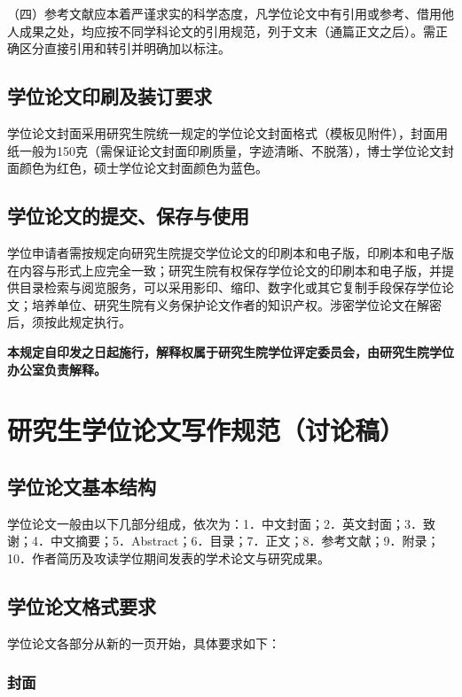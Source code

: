 \documentclass[a4paper,12pt,oneside,openany]{book}
\begin{document}
（四）参考文献应本着严谨求实的科学态度，凡学位论文中有引用或参考、借用他人成果之处，均应按不同学科论文的引用规范，列于文末（通篇正文之后）。需正确区分直接引用和转引并明确加以标注。


\section{学位论文印刷及装订要求}

学位论文封面采用研究生院统一规定的学位论文封面格式（模板见附件），封面用纸一般为150克（需保证论文封面印刷质量，字迹清晰、不脱落），博士学位论文封面颜色为红色，硕士学位论文封面颜色为蓝色。


\section{学位论文的提交、保存与使用}

学位申请者需按规定向研究生院提交学位论文的印刷本和电子版，印刷本和电子版在内容与形式上应完全一致；研究生院有权保存学位论文的印刷本和电子版，并提供目录检索与阅览服务，可以采用影印、缩印、数字化或其它复制手段保存学位论文；培养单位、研究生院有义务保护论文作者的知识产权。涉密学位论文在解密后，须按此规定执行。

\textbf{本规定自印发之日起施行，解释权属于研究生院学位评定委员会，由研究生院学位办公室负责解释。} 


\chapter{研究生学位论文写作规范（讨论稿）}


\section{学位论文基本结构}

学位论文一般由以下几部分组成，依次为：1．中文封面；2．英文封面；3．致谢；4．中文摘要；5．Abstract；6．目录；7．正文；8．参考文献；9．附录；10．作者简历及攻读学位期间发表的学术论文与研究成果。 


\section{学位论文格式要求}

学位论文各部分从新的一页开始，具体要求如下：


\subsection{封面}
\end{document}
